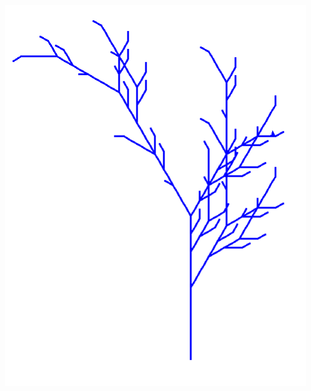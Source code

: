 \documentclass[11pt,class=report,crop=false]{standalone}
\begin{document}
\begin{activite}
\begin{enumerate}
\begin{center}
\includegraphics[scale=\myscale,scale=0.25]{ecran-lsysteme-12}
\end{center}
	
  
 \end{enumerate}


\end{activite}
\end{document}
